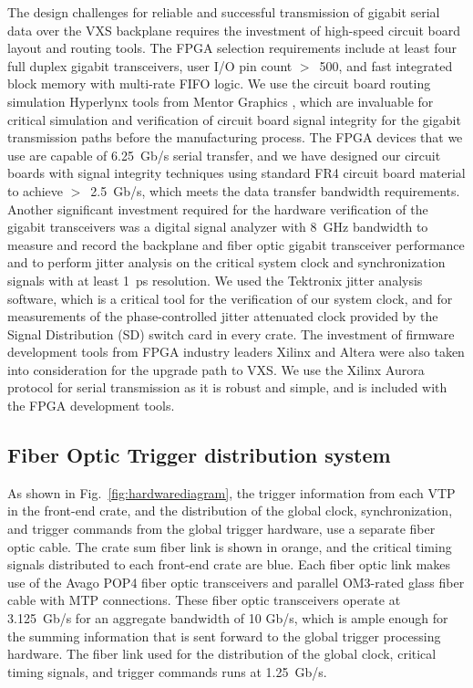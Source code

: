 The design challenges for reliable and successful transmission of gigabit serial data over the VXS backplane requires the investment of high-speed circuit board layout and routing tools.  The FPGA selection requirements include at least four full duplex gigabit transceivers, user I/O pin count $>$~500, and fast integrated block memory with multi-rate FIFO logic. We use the circuit board routing simulation Hyperlynx tools from Mentor Graphics \cite{hyperlynx-ref}, which are invaluable for critical simulation and verification of circuit board signal integrity for the gigabit transmission paths before the manufacturing process.  The FPGA devices that we use are capable of 6.25~Gb/s serial transfer, and we have designed our circuit boards with signal integrity techniques using standard FR4 circuit board material to achieve $>$~2.5~Gb/s, which meets the data transfer bandwidth requirements. 
Another significant investment required for the hardware verification of the gigabit transceivers was a digital signal analyzer with 8~GHz bandwidth to measure and record the backplane and fiber optic gigabit transceiver performance and to perform jitter analysis on the critical system clock and synchronization signals with at least 1~ps resolution.  We used the Tektronix jitter analysis software, which is a critical tool for the verification of our system clock, and for measurements of the phase-controlled jitter attenuated clock provided by the Signal Distribution (SD) switch card in every crate. The investment of firmware development tools from FPGA industry leaders Xilinx and Altera were also taken into consideration for the upgrade path to VXS. We use the Xilinx Aurora protocol for serial transmission as it is robust and simple, and is included with the FPGA development tools.  


\subsection{Fiber Optic Trigger distribution system}

As shown in Fig.~\ref{fig:hardwarediagram}, the trigger information from each VTP in the front-end crate, and the distribution of the global clock, synchronization, and trigger commands from the global trigger hardware, use a separate fiber optic cable.  The crate sum fiber link is shown in orange, and the critical timing signals distributed to each front-end crate are blue.  Each fiber optic link makes use of the Avago POP4 fiber optic transceivers and parallel OM3-rated glass fiber cable with MTP connections. These fiber optic transceivers operate at 3.125~Gb/s for an aggregate bandwidth of 10 Gb/s, which is ample enough for the summing information that is sent forward to the global trigger processing hardware.  The fiber link used for the distribution of the global clock, critical timing signals, and trigger commands runs at 1.25~Gb/s.

